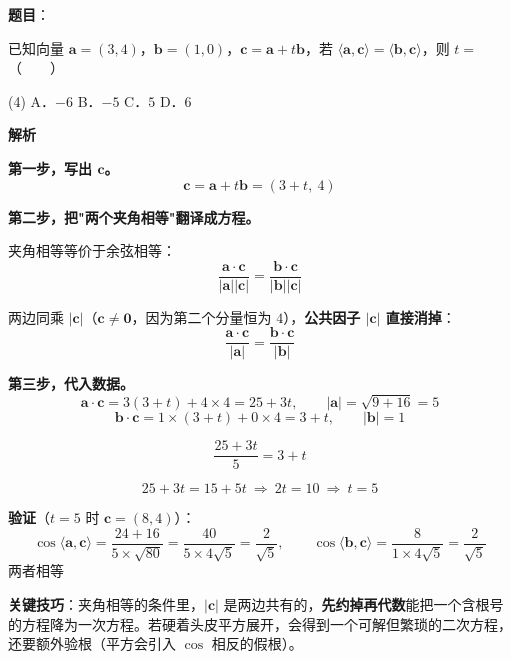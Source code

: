 \begin{answer}

\textbf{题目}：

已知向量 $\boldsymbol a=(3,4)$，$\boldsymbol b=(1,0)$，$\boldsymbol c=\boldsymbol a+t\boldsymbol b$，若 $\langle\boldsymbol a,\boldsymbol c\rangle=\langle\boldsymbol b,\boldsymbol c\rangle$，则 $t=$\mbox{（　　）}

\begin{gkopts}(4)
\task A．$-6$
\task B．$-5$
\task C．$5$
\task D．$6$
\end{gkopts}

\textbf{解析}

\textbf{第一步，写出 $\boldsymbol c$。}
\nopagebreak[4]
\[\boldsymbol c=\boldsymbol a+t\boldsymbol b=(3+t,\ 4)\]

\textbf{第二步，把"两个夹角相等"翻译成方程。}

夹角相等等价于余弦相等：
\nopagebreak[4]
\[\frac{\boldsymbol a\cdot\boldsymbol c}{|\boldsymbol a||\boldsymbol c|}=\frac{\boldsymbol b\cdot\boldsymbol c}{|\boldsymbol b||\boldsymbol c|}\]

两边同乘 $|\boldsymbol c|$（$\boldsymbol c\ne\boldsymbol0$，因为第二个分量恒为 $4$），\textbf{公共因子 $|\boldsymbol c|$ 直接消掉}：
\nopagebreak[4]
\[\frac{\boldsymbol a\cdot\boldsymbol c}{|\boldsymbol a|}=\frac{\boldsymbol b\cdot\boldsymbol c}{|\boldsymbol b|}\]

\textbf{第三步，代入数据。}
\nopagebreak[4]
\[\boldsymbol a\cdot\boldsymbol c=3(3+t)+4\times4=25+3t,\qquad|\boldsymbol a|=\sqrt{9+16}=5\]
\nopagebreak[4]
\[\boldsymbol b\cdot\boldsymbol c=1\times(3+t)+0\times4=3+t,\qquad|\boldsymbol b|=1\]

\nopagebreak[4]
\[\frac{25+3t}5=3+t\]

\nopagebreak[4]
\[25+3t=15+5t\ \Longrightarrow\ 2t=10\ \Longrightarrow\ t=5\]

\textbf{验证}（$t=5$ 时 $\boldsymbol c=(8,4)$）：
\nopagebreak[4]
\[\cos\langle\boldsymbol a,\boldsymbol c\rangle=\frac{24+16}{5\times\sqrt{80}}=\frac{40}{5\times4\sqrt5}=\frac{2}{\sqrt5},\qquad\cos\langle\boldsymbol b,\boldsymbol c\rangle=\frac{8}{1\times4\sqrt5}=\frac2{\sqrt5}\]
两者相等 

\begin{gktip}
\textbf{关键技巧}：夹角相等的条件里，$|\boldsymbol c|$ 是两边共有的，\textbf{先约掉再代数}能把一个含根号的方程降为一次方程。若硬着头皮平方展开，会得到一个可解但繁琐的二次方程，还要额外验根（平方会引入 $\cos$ 相反的假根）。


\end{gktip}
\end{answer}
